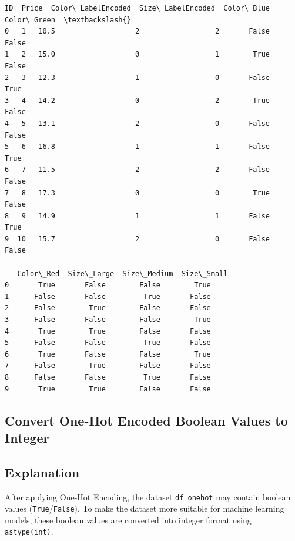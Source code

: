 \documentclass[11pt,a4paper]{report}
\makeatletter
\newcommand{\boxspacing}{\kern\kvtcb@left@rule\kern\kvtcb@boxsep}
\newcommand{\prompt}[4]{
        {\ttfamily\llap{{\color{#2}[#3]:\hspace{3pt}#4}}\vspace{-\baselineskip}}
    }
\makeatother
\begin{document}
            \begin{tcolorbox}[breakable, size=fbox, boxrule=.5pt, pad at break*=1mm, opacityfill=0]
\prompt{Out}{outcolor}{5}{\boxspacing}
\begin{Verbatim}[commandchars=\\\{\}]
   ID  Price  Color\_LabelEncoded  Size\_LabelEncoded  Color\_Blue  Color\_Green  \textbackslash{}
0   1   10.5                   2                  2       False        False
1   2   15.0                   0                  1        True        False
2   3   12.3                   1                  0       False         True
3   4   14.2                   0                  2        True        False
4   5   13.1                   2                  0       False        False
5   6   16.8                   1                  1       False         True
6   7   11.5                   2                  2       False        False
7   8   17.3                   0                  0        True        False
8   9   14.9                   1                  1       False         True
9  10   15.7                   2                  0       False        False

   Color\_Red  Size\_Large  Size\_Medium  Size\_Small
0       True       False        False        True
1      False       False         True       False
2      False        True        False       False
3      False       False        False        True
4       True        True        False       False
5      False       False         True       False
6       True       False        False        True
7      False        True        False       False
8      False       False         True       False
9       True        True        False       False
\end{Verbatim}
\end{tcolorbox}
        
        
\subsection{Convert One-Hot Encoded Boolean Values to Integer}

\subsection*{Explanation}
After applying One-Hot Encoding, the dataset \texttt{df\_onehot} may contain boolean values (\texttt{True}/\texttt{False}). To make the dataset more suitable for machine learning models, these boolean values are converted into integer format using \texttt{astype(int)}.
\end{document}
